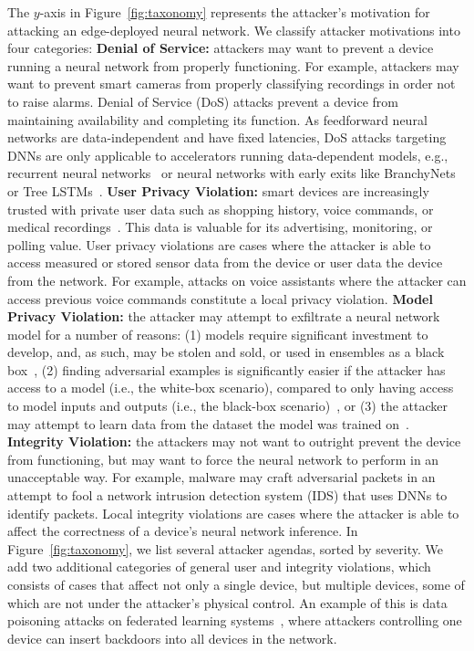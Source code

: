 The $y$-axis in Figure~\ref{fig:taxonomy} represents the attacker's motivation for attacking an edge-deployed neural network.
We classify attacker motivations into four categories: 
\noindent \textbf{Denial of Service: } attackers may want to prevent a device running a neural network from properly functioning. For example, attackers may want to prevent smart cameras from properly classifying recordings in order not to raise alarms. Denial of Service (DoS) attacks prevent a device from maintaining availability and completing its function. As feedforward neural networks are data-independent and have fixed latencies, DoS attacks targeting DNNs are only applicable to accelerators running data-dependent models, e.g., recurrent neural networks~ or neural networks with early exits like BranchyNets~ or Tree LSTMs~.
\noindent \textbf{User Privacy Violation: } smart devices are increasingly trusted with private user data such as shopping history, voice commands, or medical recordings~. This data is valuable for its advertising, monitoring, or polling value. User privacy violations are cases where the attacker is able to access measured or stored sensor data from the device or user data the device from the network. For example, attacks on voice assistants where the attacker can access previous voice commands constitute a local privacy violation. 
\noindent \textbf{Model Privacy Violation: } the attacker may attempt to exfiltrate a neural network model for a number of reasons: (1) models require significant investment to develop, and, as such, may be stolen and sold, or used in ensembles as a black box~, (2) finding adversarial examples is significantly easier if the attacker has access to a model (i.e., the white-box scenario), compared to only having access to model inputs and outputs (i.e., the black-box scenario)~, or (3) the attacker may attempt to learn data from the dataset the model was trained on~. 
\noindent \textbf{Integrity Violation: } the attackers may not want to outright prevent the device from functioning, but may want to force the neural network to perform in an unacceptable way. For example, malware may craft adversarial packets in an attempt to fool a network intrusion detection system (IDS) that uses DNNs to identify packets. Local integrity violations are cases where the attacker is able to affect the correctness of a device's neural network inference.
In Figure~\ref{fig:taxonomy}, we list several attacker agendas, sorted by severity. We add two additional categories of general user and integrity violations, which consists of cases that affect not only a single device, but multiple devices, some of which are not under the attacker's physical control. An example of this is data poisoning attacks on federated learning systems~, where attackers controlling one device can insert backdoors into all devices in the network.

